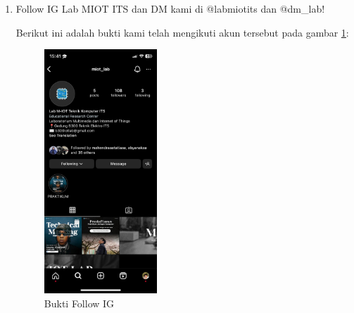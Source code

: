\begin{enumerate}
  \item Follow IG Lab MIOT ITS dan DM kami di @labmiotits dan @dm\_lab!
  
  Berikut ini adalah bukti kami telah mengikuti akun tersebut pada gambar \ref{fig:ig}:

  \begin{figure}[H]
    \centering
    \includegraphics[width=0.4\textwidth]{img/ss_follow_b3.jpeg}
    \caption{Bukti Follow IG}
    \label{fig:ig}
  \end{figure}
        
\end{enumerate}